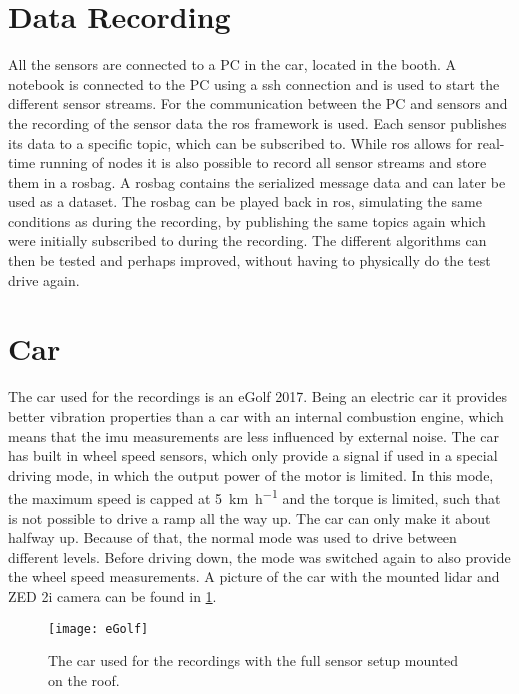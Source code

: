 \section{Data Recording}
All the sensors are connected to a PC in the car, located in the booth.
A notebook is connected to the PC using a \gls{ssh} connection and is used to start the different sensor streams.
For the communication between the PC and sensors and the recording of the sensor data the \gls{ros} framework is used.
Each sensor publishes its data to a specific topic, which can be subscribed to.
While \gls{ros} allows for real-time running of nodes it is also possible to record all sensor streams and store them in a rosbag.
A rosbag contains the serialized message data and can later be used as a dataset.
The rosbag can be played back in \gls{ros}, simulating the same conditions as during the recording, by publishing the same topics again which were initially subscribed to during the recording.
The different algorithms can then be tested and perhaps improved, without having to physically do the test drive again.


\section{Car}
\label{sec:car}
The car used for the recordings is an eGolf 2017.
Being an electric car it provides better vibration properties than a car with an internal combustion engine, which means that the \gls{imu} measurements are less influenced by external noise.
The car has built in wheel speed sensors, which only provide a signal if used in a special driving mode, in which the output power of the motor is limited.
In this mode, the maximum speed is capped at \SI{5}{\kilo\metre\per\hour} and the torque is limited, such that is not possible to drive a ramp all the way up.
The car can only make it about halfway up.
Because of that, the normal mode was used to drive between different levels.
Before driving down, the mode was switched again to also provide the wheel speed measurements.
A picture of the car with the mounted \gls{lidar} and ZED 2i camera can be found in \cref{fig:eGolf}.
\begin{figure}[htb]
    \centering
    \texttt{[image: eGolf]}
    \caption[Car with mounted sensors]{The car used for the recordings with the full sensor setup mounted on the roof.}
    \label{fig:eGolf}
\end{figure}



